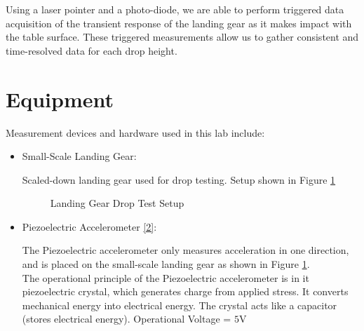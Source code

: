 \documentclass{article}
\begin{document}
Using a laser pointer and a photo-diode, we are able to perform triggered data acquisition of the transient response of the landing gear as it makes impact with the table surface. These triggered measurements allow us to gather consistent and time-resolved data for each drop height.

\section{Equipment}
Measurement devices and hardware used in this lab include:
\begin{itemize}

\item Small-Scale Landing Gear: 
\vspace{1mm}

Scaled-down landing gear used for drop testing. Setup shown in Figure \ref{fig:gearsetup}

\begin{figure}[H]
    \centering
    \caption{Landing Gear Drop Test Setup}
    \label{fig:gearsetup}
\end{figure}

\vspace{2.5mm}

\item Piezoelectric Accelerometer \hyperlink{2}{[2]}:
\vspace{1mm}

The Piezoelectric accelerometer only measures acceleration in one direction, and is placed on the small-scale landing gear as shown in Figure \ref{fig:gearsetup}.\\[1mm]
The operational principle of the Piezoelectric accelerometer is in it piezoelectric crystal, which generates charge from applied stress. It converts mechanical energy into electrical energy. The crystal acts like a capacitor (stores electrical energy). Operational Voltage = $5\text{V}$
\vspace{2.5mm}


\end{itemize}
\end{document}
